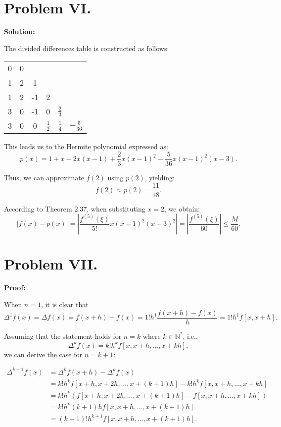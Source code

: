 \documentclass[a4paper, 12pt]{article}
\begin{document}
\section*{Problem VI.}

\textbf{Solution:}

The divided differences table is constructed as follows:

\begin{table}[h]
    \centering
    \begin{tabular}{c|ccccc}
        0 & 0 &  &  &  &    \\
        1 & 2 & 1 &  &  &    \\
        1 & 2 & -1 & 2 &  &    \\
        3 & 0 & -1 & 0 & $\frac{2}{3}$ &    \\
        3 & 0 & 0 & $\frac{1}{2}$ & $\frac{1}{4}$ & $-\frac{5}{36}$ 
    \end{tabular}
\end{table}

This leads us to the Hermite polynomial expressed as:
\[
p(x)=1+x-2x(x-1)+\frac{2}{3}x(x-1)^2-\frac{5}{36}x(x-1)^2(x-3).
\]

Thus, we can approximate \( f(2) \) using \( p(2) \), yielding:
\[
\boxed{f(2) \approx p(2) = \frac{11}{18}}.
\]

According to Theorem 2.37, when substituting \( x=2 \), we obtain:
\[
\boxed{|f(x)-p(x)| = \left|\frac{f^{(5)}(\xi)}{5!}x(x-1)^2(x-3)^2\right| = \left|\frac{f^{(5)}(\xi)}{60}\right| \leq \frac{M}{60}}.
\]

\section*{Problem VII.}

\textbf{Proof:}

When \( n=1 \), it is clear that 
\[
\Delta^1 f(x) = \Delta f(x) = f(x+h) - f(x) = 1! h^1 \frac{f(x+h) - f(x)}{h} = 1! h^1 f[x, x+h].
\]

Assuming that the statement holds for \( n=k \) where \( k \in \mathbb{N}^* \), i.e., 
\[
\Delta^k f(x) = k! h^k f[x, x+h, \ldots, x+kh],
\]
we can derive the case for \( n=k+1 \):

\[
\begin{aligned}
\Delta^{k+1} f(x) & = \Delta^k f(x+h) - \Delta^k f(x) \\
& = k! h^k f[x+h, x+2h, \ldots, x+(k+1)h] - k! h^k f[x, x+h, \ldots, x+kh] \\
& = k! h^k \left( f[x+h, x+2h, \ldots, x+(k+1)h] - f[x, x+h, \ldots, x+kh] \right) \\
& = k! h^k (k+1) h f[x, x+h, \ldots, x+(k+1)h] \\
& = (k+1)! h^{k+1} f[x, x+h, \ldots, x+(k+1)h].
\end{aligned}
\]
\end{document}
